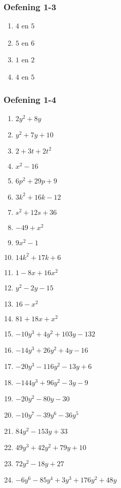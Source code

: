{\begin{multicols}{3}
\subsubsection*{Oefening 1-3} %

\begin{enumerate}[noitemsep, label=\textbf{\arabic*}. ]
\item $4$ en $5$%
\item $5$ en $6$%
\item $1$ en $2$%
\item $4$ en $5$%

\end{enumerate}


\subsubsection*{Oefening 1-4} %



\begin{enumerate}[label=\textbf{\arabic*}., noitemsep]
\item $2y^2 + 8y$%
\item $y^2 + 7y + 10$%
\item $2 + 3t +2t^2$%
\item $x^2 - 16$%
\item $6p^2 + 29p + 9$%
\item $3k^2 +16k - 12$%
\item $s^2 + 12s +36$%
\item $-49 + x^2$%
\item $9x^2 - 1$%
\item $14k^2 + 17k + 6$%
\item $1 -8x + 16x^2$%
\item $y^2 - 2y - 15$%
\item $16 - x^2$%
\item $81 + 18x + x^2$%
\item $-10y^3 + 4y^2 + 103y - 132$%
\item $-14y^3 + 26y^2 + 4y -16$ %
\item $-20y^3 -116y^2 -13y +6$%
\item $-144y^3 + 96y^2 -3y -9$%
\item $-20y^2 - 80y - 30$%
\item $-10y^7 - 39y^6 - 36y^5$%
\item $84y^2 - 153y +33$%
\item $49y^3 + 42y^2 + 79y + 10$%
\item $72y^2 - 18y + 27$%
\item $-6y^6 - 85y^4 + 3y^3 + 176y^2 + 48y$%
\end{enumerate}



\end{multicols}}
